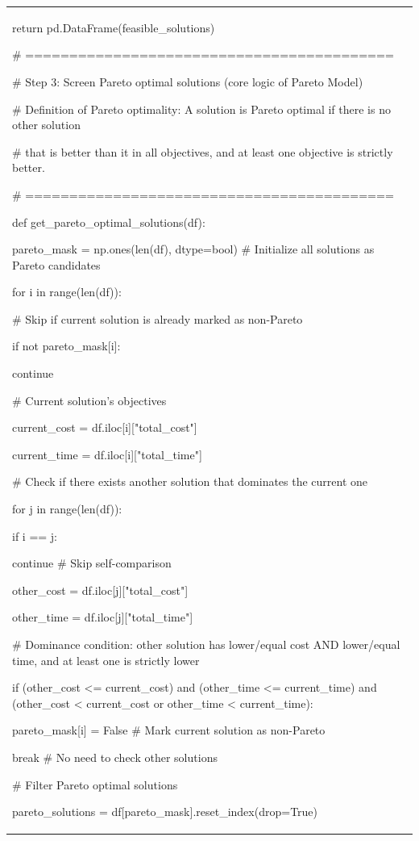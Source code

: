 \begin{longtable}[]{@{}
  >{\raggedright\arraybackslash}p{}@{}}
return pd.DataFrame(feasible\_solutions)

\# ==========================================

\# Step 3: Screen Pareto optimal solutions (core logic of Pareto Model)

\# Definition of Pareto optimality: A solution is Pareto optimal if
there is no other solution

\# that is better than it in all objectives, and at least one objective
is strictly better.

\# ==========================================

def get\_pareto\_optimal\_solutions(df):

pareto\_mask = np.ones(len(df), dtype=bool) \# Initialize all solutions
as Pareto candidates

for i in range(len(df)):

\# Skip if current solution is already marked as non-Pareto

if not pareto\_mask{[}i{]}:

continue

\# Current solution's objectives

current\_cost = df.iloc{[}i{]}{[}"total\_cost"{]}

current\_time = df.iloc{[}i{]}{[}"total\_time"{]}

\# Check if there exists another solution that dominates the current one

for j in range(len(df)):

if i == j:

continue \# Skip self-comparison

other\_cost = df.iloc{[}j{]}{[}"total\_cost"{]}

other\_time = df.iloc{[}j{]}{[}"total\_time"{]}

\# Dominance condition: other solution has lower/equal cost AND
lower/equal time, and at least one is strictly lower

if (other\_cost \textless= current\_cost) and (other\_time \textless=
current\_time) and (other\_cost \textless{} current\_cost or other\_time
\textless{} current\_time):

pareto\_mask{[}i{]} = False \# Mark current solution as non-Pareto

break \# No need to check other solutions

\# Filter Pareto optimal solutions

pareto\_solutions = df{[}pareto\_mask{]}.reset\_index(drop=True)


\end{longtable}

